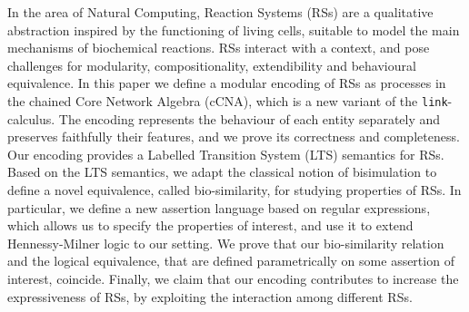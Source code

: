 
In the area of Natural Computing, Reaction Systems (RSs) are
a qualitative abstraction inspired by the 
functioning of living cells, suitable to model the main
mechanisms of biochemical reactions.
RSs interact with a context, and
pose challenges for modularity, compositionality, extendibility and behavioural equivalence. 
In this paper we define a modular encoding of RSs as processes
in the chained Core Network Algebra (cCNA), which is a new variant  of the  {\tt link}-calculus.
The encoding represents the behaviour of each entity separately and
preserves faithfully their features, and we prove its correctness and completeness.
Our encoding provides a Labelled Transition System (LTS) semantics for RSs. Based on the LTS semantics, we adapt  the classical notion of  bisimulation to define a novel equivalence, called bio-similarity, for studying properties of RSs.
In particular, we define a new assertion language based on regular expressions, 
which allows us to specify the properties of interest, and use it to extend Hennessy-Milner logic
to our setting.
We prove that our bio-similarity relation and the logical equivalence, that are defined parametrically on some assertion of interest, coincide.
Finally, 
we claim that
our encoding 
contributes to increase the expressiveness
of RSs, by exploiting the interaction among 
different RSs. 
